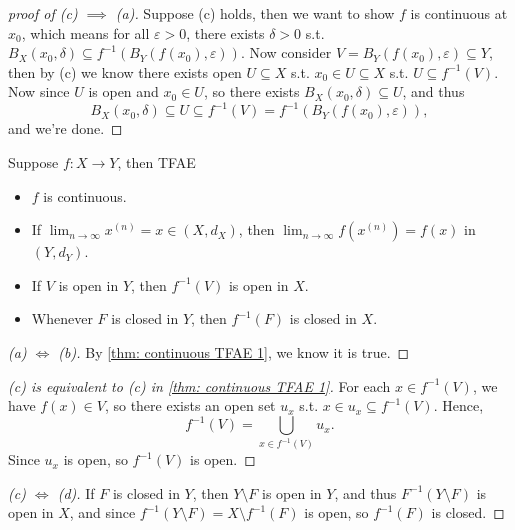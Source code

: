 \begin{proof}[proof of (c) \(\implies \) (a)]
    Suppose (c) holds, then we want to show \(f\) is continuous at \(x_0\), which means for all \(\varepsilon > 0\), there exists \(\delta > 0\) s.t. \(B_X(x_0, \delta ) \subseteq f^{-1} \left( B_Y(f(x_0), \varepsilon ) \right) \). Now consider \(V = B_Y(f(x_0), \varepsilon ) \subseteq Y\), then by (c) we know there exists open \(U \subseteq X\) s.t. \(x_0 \in U \subseteq X\) s.t. \(U \subseteq f^{-1}(V) \). Now since \(U\) is open and \(x_0 \in U\), so there exists \(B_X(x_0, \delta ) \subseteq U\), and thus 
    \[
        B_X(x_0, \delta ) \subseteq U \subseteq f^{-1}(V) = f^{-1} \left( B_Y (f(x_0), \varepsilon ) \right), 
    \] and we're done.
\end{proof}

\begin{theorem}
    Suppose \(f: X \to Y\), then TFAE 
    \begin{itemize}
        \item [(a)] \(f\) is continuous. 
        \item [(b)] If \(\lim_{n \to \infty} x^{(n)} = x \in (X, d_X)\), then \(\lim_{n \to \infty} f \left( x^{(n)} \right) = f(x)  \) in \(\left( Y, d_Y \right) \). 
        \item [(c)] If \(V\) is open in \(Y\), then \(f^{-1}(V)\) is open in \(X\). 
        \item [(d)] Whenever \(F\) is closed in \(Y\), then \(f^{-1}(F)\) is closed in \(X\).         
    \end{itemize}
\end{theorem}
\begin{proof}[(a) \(\iff \) (b)]
    By \autoref{thm: continuous TFAE 1}, we know it is true. 
\end{proof}
\begin{proof}[(c) is equivalent to (c) in \autoref{thm: continuous TFAE 1}]
    For each \(x \in f^{-1}(V)\), we have \(f(x) \in V\), so there exists an open set \(u_x\) s.t. \(x \in u_x \subseteq f^{-1}(V)\). Hence, 
    \[
        f^{-1}(V) = \bigcup_{x \in f^{-1}(V)} u_x .  
    \] Since \(u_x\) is open, so \(f^{-1}(V)\) is open.     
\end{proof}
\begin{proof}[(c) \(\iff \) (d)]
    If \(F\) is closed in \(Y\), then \(Y \setminus F\) is open in \(Y\), and thus \(F^{-1}(Y \setminus F) \) is open in \(X\), and since \(f^{-1} (Y \setminus F) = X \setminus f^{-1}(F) \) is open, so \(f^{-1}(F) \) is closed.        
\end{proof}

